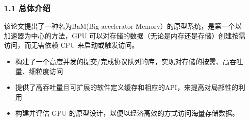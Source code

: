 \documentclass[10pt]{ctexbeamer}
\begin{document}
\begin{frame}
  \frametitle{1.1 总体介绍}


  该论文提出了一种名为BaM(Big accelerator Memory）的原型系统，是第一个以加速器为中心的方法，GPU 可以对存储的数据（无论是内存还是存储）创建按需访问，而无需依赖 CPU 来启动或触发访问。
  
  \begin{itemize}
    \item 构建了一个高度并发的提交/完成协议队列的库，实现对存储的按需、高吞吐量、细粒度访问
    \item 提供了高吞吐量且可扩展的软件定义缓存和相应的API，来提高对局部性的利用
    \item 构建并评估 GPU 的原型设计，以便以经济高效的方式访问海量存储数据。
  \end{itemize}

\end{frame}






\end{document}

